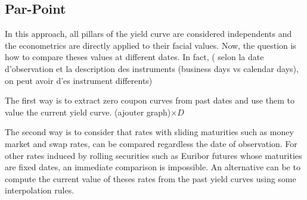 \documentclass[3pt]{article}
\begin{document}
\subsection{Par-Point}

In this approach, all pillars of the yield curve are considered independents
and the econometrics are directly applied to their facial values. Now, the
question is how to compare theses values at different dates. In fact, (
selon la date d'observation et la description des instruments (business days
vs calendar days), on peut avoir d'es instrument differents)

\bigskip

The first way is to extract zero coupon curves from past dates and use them
to value the current yield curve. (ajouter graph)$\times D$

\bigskip

\bigskip

\bigskip

The second way is to consider that rates with sliding maturities such as
money market and swap rates, can be compared regardless the date of
observation. For other rates induced by rolling securities such as Euribor
futures whose maturities are fixed dates, an immediate comparison is
impossible. An alternative can be to compute the current value of theses
rates from the past yield curves using some interpolation rules.

\bigskip

\bigskip

\bigskip

\bigskip

\bigskip

\bigskip

\bigskip

\bigskip

\bigskip

\bigskip

\bigskip

\bigskip

\bigskip

\bigskip

\bigskip

\bigskip

\bigskip

\bigskip

\bigskip

\bigskip

\bigskip

\bigskip

\bigskip
\end{document}
